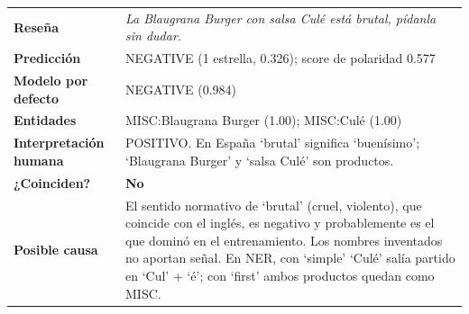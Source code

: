 \documentclass[12pt,a4paper]{article}
\begin{document}
\par\noindent\begin{minipage}{\linewidth}\centering\small\renewcommand{\arraystretch}{1.3}
\begin{tabular}{|>{\raggedright\arraybackslash}p{3.1cm}|>{\raggedright\arraybackslash}p{11.9cm}|}
\hline
\multicolumn{2}{|l|}{\textbf{\textcolor{azulUVG}{\#29 · Entidad desconocida + jerga}}} \\ \hline
\textbf{Reseña} & \emph{La Blaugrana Burger con salsa Culé está brutal, pídanla sin dudar.} \\ \hline
\textbf{Predicción} & NEGATIVE (1 estrella, 0.326); score de polaridad 0.577 \\ \hline
\textbf{Modelo por defecto} & NEGATIVE (0.984) \\ \hline
\textbf{Entidades} & MISC:Blaugrana Burger (1.00); MISC:Culé (1.00) \\ \hline
\textbf{Interpretación humana} & POSITIVO. En España `brutal' significa `buenísimo'; `Blaugrana Burger' y `salsa Culé' son productos. \\ \hline
\textbf{¿Coinciden?} & \textbf{\textcolor{red!70!black}{No}} \\ \hline
\textbf{Posible causa} & El sentido normativo de `brutal' (cruel, violento), que coincide con el inglés, es negativo y probablemente es el que dominó en el entrenamiento. Los nombres inventados no aportan señal. En NER, con `simple' `Culé' salía partido en `Cul' + `é'; con `first' ambos productos quedan como MISC. \\ \hline
\end{tabular}
\end{minipage}\par\bigskip
\end{document}
